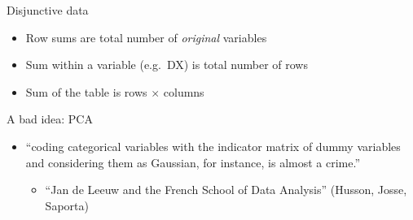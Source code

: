\documentclass[
  ignorenonframetext,
]{beamer}
\providecommand{\tightlist}{%
  \setlength{\itemsep}{0pt}\setlength{\parskip}{0pt}}
\begin{document}
\begin{frame}{Disjunctive data}
\protect\hypertarget{disjunctive-data-1}{}

\begin{table}[H]
\centering
{}
\end{table}

\begin{itemize}[<+->]
\tightlist
\item
  Row sums are total number of \emph{original} variables
\item
  Sum within a variable (e.g.~DX) is total number of rows
\item
  Sum of the table is rows \(\times\) columns
\end{itemize}

\end{frame}

\begin{frame}{A bad idea: PCA}
\protect\hypertarget{a-bad-idea-pca}{}

\begin{itemize}[<+->]
\tightlist
\item
  ``coding categorical variables with the indicator matrix of dummy
  variables and considering them as Gaussian, for instance, is almost a
  crime.''

  \begin{itemize}[<+->]
  \tightlist
  \item
    ``Jan de Leeuw and the French School of Data Analysis'' (Husson,
    Josse, Saporta)
  \end{itemize}
\end{itemize}

\end{frame}
\end{document}
